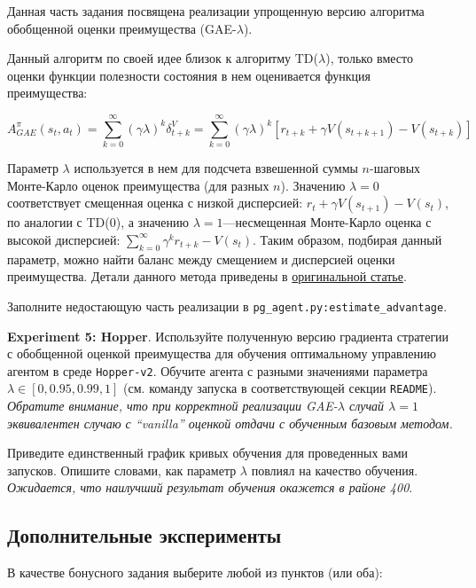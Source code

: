 \documentclass[12pt, oneside]{article}
\begin{document}
Данная часть задания посвящена реализации упрощенную версию алгоритма обобщенной оценки преимущества (GAE-$\lambda$).

Данный алгоритм по своей идее близок к алгоритму TD($\lambda$), только вместо оценки функции полезности состояния в нем оценивается функция преимущества:

\begin{equation}
    A_{GAE}^\pi (s_t, a_t) = \sum_{k=0}^{\infty} {(\gamma \lambda)^k \delta_{t+k}^V} = \sum_{k=0}^{\infty} {(\gamma \lambda)^k [r_{t+k} + \gamma V(s_{t+k+1}) - V(s_{t+k})]}
\end{equation}

\noindent
Параметр $\lambda$ используется в нем для подсчета взвешенной суммы $n$-шаговых Монте-Карло оценок преимущества (для разных $n$). Значению $\lambda = 0$ соответствует смещенная оценка с низкой дисперсией: $r_t + \gamma V(s_{t+1}) - V(s_t)$, по аналогии с TD(0), а значению $\lambda = 1$---несмещенная Монте-Карло оценка с высокой дисперсией: $\sum_{k=0}^{\infty} {\gamma^k r_{t+k}} - V(s_t)$. Таким образом, подбирая данный параметр, можно найти баланс между смещением и дисперсией оценки преимущества. Детали данного метода приведены в \href{https://arxiv.org/pdf/1506.02438.pdf}{оригинальной статье}.

Заполните недостающую часть реализации в \verb|pg_agent.py:estimate_advantage|.

\textbf{Experiment 5: Hopper}. Используйте полученную версию градиента стратегии с обобщенной оценкой преимущества для обучения оптимальному управлению агентом в среде \verb|Hopper-v2|. Обучите агента с разными значениями параметра $\lambda \in [0, 0.95, 0.99, 1]$ (см. команду запуска в соответствующей секции \verb|README|). \textit{Обратите внимание, что при корректной реализации GAE-$\lambda$ случай $\lambda = 1$ эквивалентен случаю с ``vanilla'' оценкой отдачи с обученным базовым методом.}

Приведите единственный график кривых обучения для проведенных вами запусков. Опишите словами, как параметр $\lambda$ повлиял на качество обучения. \textit{Ожидается, что наилучший результат обучения окажется в районе 400}.

\subsection{Дополнительные эксперименты}

В качестве бонусного задания выберите любой из пунктов (или оба):
\end{document}
